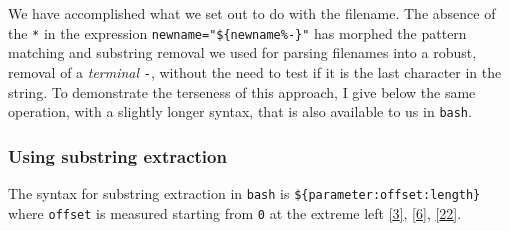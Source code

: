 \documentclass[
  a4paper,
]{article}
\begin{document}
We have accomplished what we set out to do with the filename. The
absence of the \texttt{*} in the expression
\texttt{newname="\$\{newname\%-\}"} has morphed the pattern matching and
substring removal we used for parsing filenames into a robust, removal
of a \emph{terminal} \texttt{-}, without the need to test if it is the
last character in the string. To demonstrate the terseness of this
approach, I give below the same operation, with a slightly longer
syntax, that is also available to us in \texttt{bash}.

\hypertarget{using-substring-extraction}{%
\subsubsection{Using substring
extraction}\label{using-substring-extraction}}

The syntax for substring extraction in \texttt{bash} is
\texttt{\$\{parameter:offset:length\}} where \texttt{offset} is measured
starting from \texttt{0} at the extreme left
\protect\hyperlink{ref-parametersubs}{{[}3{]}},
\protect\hyperlink{ref-stringops}{{[}6{]}},
\protect\hyperlink{ref-substring}{{[}22{]}}.
\end{document}
